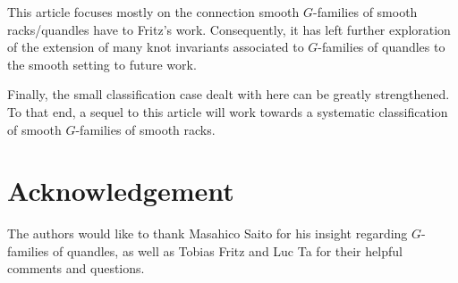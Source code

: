 \documentclass[12pt]{amsart}
\theoremstyle{plain}
\theoremstyle{definition}
\begin{document}
This article focuses mostly on the connection smooth $G$-families of smooth racks/quandles have to Fritz's work. Consequently, it has left further exploration of the extension of many knot invariants associated to $G$-families of quandles to the smooth setting to future work.

Finally, the small classification case dealt with here can be greatly strengthened. To that end, a sequel to this article will work towards a systematic classification of smooth $G$-families of smooth racks.

\section*{Acknowledgement} 
	The authors would like to thank Masahico Saito for his insight regarding $G$-families of quandles, as well as Tobias Fritz and Luc Ta for their helpful comments and questions.
    
\end{document}
